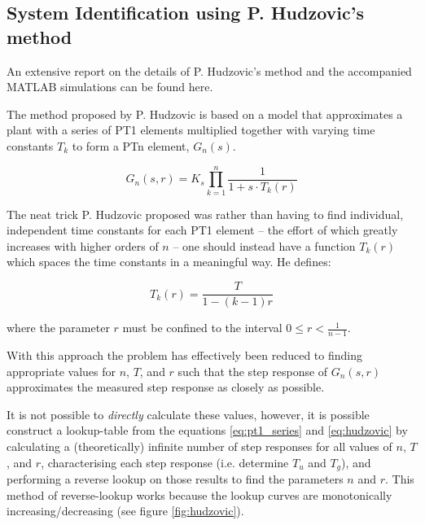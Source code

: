\subsection{System Identification using P. Hudzovic's method}

An extensive report on the details of P. Hudzovic's method and the accompanied
MATLAB simulations can be found here\cite{ref:comet}.

The method proposed by P. Hudzovic\cite{ref:hudzovic} is based on a model that
approximates a plant with a series of  PT1  elements  multiplied together with
varying time constants $T_k$ to form a PTn element, $G_n(s)$.

\begin{equation}
    G_n(s,r) = K_s\prod_{k=1}^{n}\frac{1}{1+s\cdot T_k(r)}
    \label{eq:pt1_series}
\end{equation}

The neat trick P. Hudzovic proposed was rather than having to find individual,
independent time constants for each PT1 element -- the effort of which greatly
increases with higher orders of $n$  --  one  should  instead  have a function
$T_k(r)$  which  spaces the time constants in a meaningful  way.  He  defines:

\begin{equation}
    T_k(r) = \frac{T}{1-(k-1)r}
    \label{eq:hudzovic}
\end{equation}

where  the  parameter  $r$  must  be confined to  the  interval  $0  \le  r  <
\frac{1}{n-1}$.

With  this  approach  the  problem  has  effectively been reduced  to  finding
appropriate values for $n$,  $T$,  and  $r$  such  that  the  step response of
$G_n(s,r)$  approximates the measured step response as  closely  as  possible.

It is not possible to \textit{directly} calculate these values, however, it is
possible construct a lookup-table from the  equations  \ref{eq:pt1_series} and
\ref{eq:hudzovic} by calculating  a  (theoretically)  infinite  number of step
responses  for  all  values  of  $n$,  $T$,  and $r$, characterising each step
response (i.e. determine $T_u$ and $T_g$),  and performing a reverse lookup on
those  results  to  find  the  parameters  $n$  and  $r$.   This   method   of
reverse-lookup   works   because   the   lookup   curves   are   monotonically
increasing/decreasing (see figure \ref{fig:hudzovic}).

